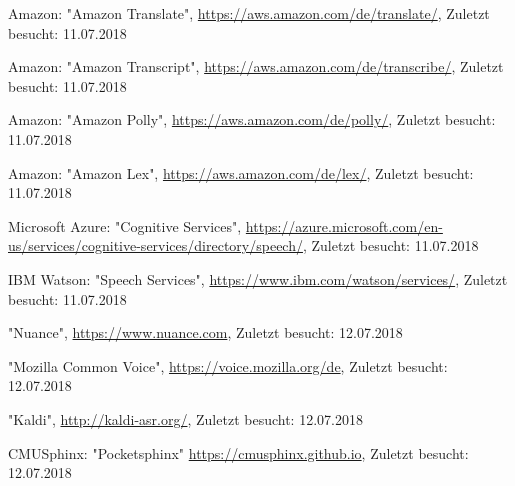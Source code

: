 \documentclass[journal]{IEEEtran}
\begin{document}
\begin{thebibliography}{1}
Amazon: "Amazon Translate",
\url{https://aws.amazon.com/de/translate/},
Zuletzt besucht: 11.07.2018

Amazon: "Amazon Transcript",
\url{https://aws.amazon.com/de/transcribe/},
Zuletzt besucht: 11.07.2018

Amazon: "Amazon Polly",
\url{https://aws.amazon.com/de/polly/},
Zuletzt besucht: 11.07.2018

Amazon: "Amazon Lex",
\url{https://aws.amazon.com/de/lex/},
Zuletzt besucht: 11.07.2018

Microsoft Azure: "Cognitive Services",
\url{https://azure.microsoft.com/en-us/services/cognitive-services/directory/speech/},
Zuletzt besucht: 11.07.2018

IBM Watson: "Speech Services",
\url{https://www.ibm.com/watson/services/},
Zuletzt besucht: 11.07.2018

"Nuance",
\url{https://www.nuance.com},
Zuletzt besucht: 12.07.2018

"Mozilla Common Voice",
\url{https://voice.mozilla.org/de},
Zuletzt besucht: 12.07.2018

"Kaldi",
\url{http://kaldi-asr.org/},
Zuletzt besucht: 12.07.2018

CMUSphinx: "Pocketsphinx"
\url{https://cmusphinx.github.io},
Zuletzt besucht: 12.07.2018
\end{thebibliography}
\end{document}
